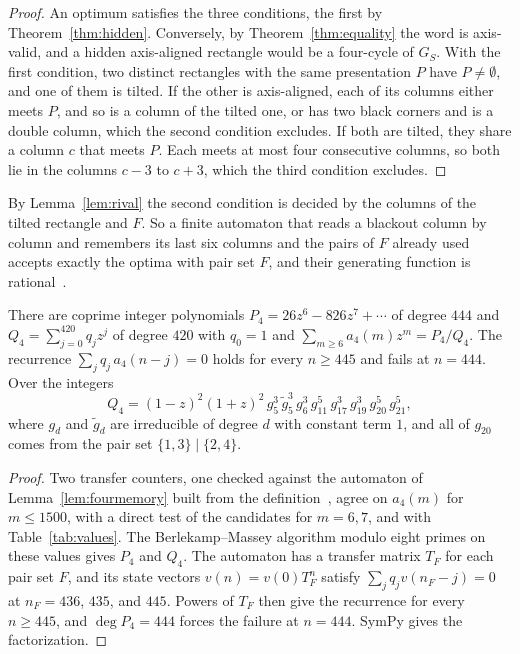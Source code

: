\begin{proof}
An optimum satisfies the three conditions, the first by Theorem~\ref{thm:hidden}. Conversely, by Theorem~\ref{thm:equality} the word is axis-valid, and a hidden axis-aligned rectangle would be a four-cycle of $G_S$. With the first condition, two distinct rectangles with the same presentation $P$ have $P\ne\emptyset$, and one of them is tilted. If the other is axis-aligned, each of its columns either meets $P$, and so is a column of the tilted one, or has two black corners and is a double column, which the second condition excludes. If both are tilted, they share a column $c$ that meets $P$. Each meets at most four consecutive columns, so both lie in the columns $c-3$ to $c+3$, which the third condition excludes.
\end{proof}

By Lemma~\ref{lem:rival} the second condition is decided by the columns of the tilted rectangle and $F$. So a finite automaton that reads a blackout column by column and remembers its last six columns and the pairs of $F$ already used accepts exactly the optima with pair set $F$, and their generating function is rational~\cite[Section~V.5]{flajolet2009}.

\begin{theorem}\label{thm:fourgfexact}
There are coprime integer polynomials $P_4=26z^6-826z^7+\cdots$ of degree $444$ and $Q_4=\sum_{j=0}^{420}q_jz^j$ of degree $420$ with $q_0=1$ and $\sum_{m\ge6}a_4(m)z^m=P_4/Q_4$. The recurrence $\sum_jq_j\,a_4(n-j)=0$ holds for every $n\ge445$ and fails at $n=444$. Over the integers
\[
Q_4=(1-z)^2(1+z)^2\,g_5^3\,\tilde g_5^3\,g_6^3\,g_{11}^5\,g_{17}^3\,g_{19}^3\,g_{20}^5\,g_{21}^5,
\]
where $g_d$ and $\tilde g_d$ are irreducible of degree $d$ with constant term $1$, and all of $g_{20}$ comes from the pair set $\{1,3\}\mid\{2,4\}$.
\end{theorem}

\begin{proof}
Two transfer counters, one checked against the automaton of Lemma~\ref{lem:fourmemory} built from the definition~\cite{repo}, agree on $a_4(m)$ for $m\le1500$, with a direct test of the candidates for $m=6,7$, and with Table~\ref{tab:values}. The Berlekamp--Massey algorithm modulo eight primes on these values gives $P_4$ and $Q_4$. The automaton has a transfer matrix $T_F$ for each pair set $F$, and its state vectors $v(n)=v(0)T_F^n$ satisfy $\sum_jq_jv(n_F-j)=0$ at $n_F=436$, $435$, and $445$. Powers of $T_F$ then give the recurrence for every $n\ge445$, and $\deg P_4=444$ forces the failure at $n=444$. SymPy gives the factorization.
\end{proof}

